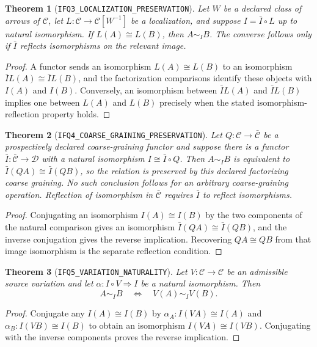\documentclass[11pt]{article}
\newtheorem{theorem}{Theorem}
\newcommand{\EqI}{\mathrel{\sim_I}}
\begin{document}
\begin{theorem}[\texttt{IFQ3\_LOCALIZATION\_PRESERVATION}]
Let \(W\) be a declared class of arrows of \(\mathcal C\), let
\(L:\mathcal C\to\mathcal C[W^{-1}]\) be a localization, and suppose
\(I=\bar I\circ L\) up to natural isomorphism.  If \(L(A)\cong L(B)\), then
\(A\EqI B\).  The converse follows only if \(\bar I\) reflects isomorphisms
on the relevant image.
\end{theorem}
\begin{proof}
A functor sends an isomorphism \(L(A)\cong L(B)\) to an isomorphism
\(\bar I L(A)\cong\bar I L(B)\), and the factorization comparisons identify
these objects with \(I(A)\) and \(I(B)\).  Conversely, an isomorphism between
\(\bar I L(A)\) and \(\bar I L(B)\) implies one between \(L(A)\) and
\(L(B)\) precisely when the stated isomorphism-reflection property holds.
\end{proof}

\begin{theorem}[\texttt{IFQ4\_COARSE\_GRAINING\_PRESERVATION}]
Let \(Q:\mathcal C\to\bar{\mathcal C}\) be a prospectively declared
coarse-graining functor and suppose there is a functor
\(\bar I:\bar{\mathcal C}\to\mathcal D\) with a natural isomorphism
\(I\cong\bar I\circ Q\).  Then \(A\EqI B\) is equivalent to
\(\bar I(QA)\cong\bar I(QB)\), so the relation is preserved by this declared
factorizing coarse graining.  No such conclusion follows for an arbitrary
coarse-graining operation.  Reflection of isomorphism in
\(\bar{\mathcal C}\) requires \(\bar I\) to reflect isomorphisms.
\end{theorem}
\begin{proof}
Conjugating an isomorphism \(I(A)\cong I(B)\) by the two components of the
natural comparison gives an isomorphism
\(\bar I(QA)\cong\bar I(QB)\), and the inverse conjugation gives the reverse
implication.  Recovering \(QA\cong QB\) from that image isomorphism is the
separate reflection condition.
\end{proof}

\begin{theorem}[\texttt{IFQ5\_VARIATION\_NATURALITY}]
Let \(V:\mathcal C\to\mathcal C\) be an admissible source variation and let
\(\alpha:I\circ V\Rightarrow I\) be a natural isomorphism.  Then
\[
  A\EqI B\quad\Longleftrightarrow\quad V(A)\EqI V(B).
\]
\end{theorem}
\begin{proof}
Conjugate any \(I(A)\cong I(B)\) by
\(\alpha_A:I(VA)\cong I(A)\) and
\(\alpha_B:I(VB)\cong I(B)\) to obtain an isomorphism
\(I(VA)\cong I(VB)\).  Conjugating with the inverse components proves the
reverse implication.
\end{proof}
\end{document}
